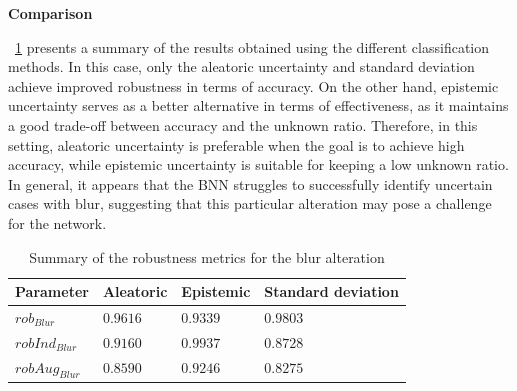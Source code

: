 \vspace{0.3cm}
\textbf{Comparison}
\vspace{0.1cm}

\Tab~\ref{table:rob_bl} presents a summary of the results obtained using the different classification methods. In this case, only the aleatoric uncertainty and standard deviation achieve improved robustness in terms of accuracy. On the other hand, epistemic uncertainty serves as a better alternative in terms of effectiveness, as it maintains a good trade-off between accuracy and the unknown ratio. Therefore, in this setting, aleatoric uncertainty is preferable when the goal is to achieve high accuracy, while epistemic uncertainty is suitable for keeping a low unknown ratio. In general, it appears that the BNN struggles to successfully identify uncertain cases with blur, suggesting that this particular alteration may pose a challenge for the network.

\begin{table}[h]
	\centering
	\begin{tabular}{|| l | l | l | l ||} 
		\hline
		\textbf{Parameter} & \textbf{Aleatoric} & \textbf{Epistemic} & \textbf{Standard deviation} \\
		\hline
		\hline
		$rob_{Blur}$ & $0.9616$ & $0.9339$ & $0.9803$ \\
		$robInd_{Blur}$ & $0.9160$ & $0.9937$ & $0.8728$ \\
		$robAug_{Blur}$ & $0.8590$ & $0.9246$ & $0.8275$ \\	
		\hline
	\end{tabular}	
	\caption{Summary of the robustness metrics for the blur alteration}
	\label{table:rob_bl}
\end{table}